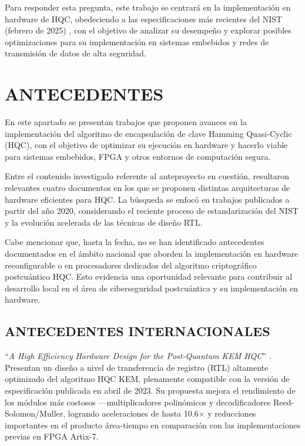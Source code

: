 Para responder esta pregunta, este trabajo se centrará en la implementación en hardware de HQC, obedeciendo a las especificaciones más recientes del NIST (febrero de 2025) \cite{HQCspec2025}, con el objetivo de analizar su desempeño y explorar posibles optimizaciones para su implementación en sistemas embebidos y redes de transmisión de datos de alta seguridad.


 \chapter{ANTECEDENTES} %
En este apartado se presentan trabajos que proponen avances en la implementación del algoritmo de encapsulación de clave Hamming Quasi-Cyclic (HQC), con el objetivo de optimizar su ejecución en hardware y hacerlo viable para sistemas embebidos, FPGA y otros entornos de computación segura.

Entre el contenido investigado referente al anteproyecto en cuestión, resultaron relevantes cuatro documentos en los que se proponen distintas arquitecturas de hardware eficientes para HQC. La búsqueda se enfocó en trabajos publicados a partir del año 2020, considerando el reciente proceso de estandarización del NIST y la evolución acelerada de las técnicas de diseño RTL.

Cabe mencionar que, hasta la fecha, no se han identificado antecedentes documentados en el ámbito nacional que aborden la implementación en hardware reconfigurable o en procesadores dedicados del algoritmo criptográfico postcuántico HQC. Esto evidencia una oportunidad relevante para contribuir al desarrollo local en el área de ciberseguridad postcuántica y su implementación en hardware.

\section{ANTECEDENTES INTERNACIONALES}
“\textit{A High Efficiency Hardware Design for the Post-Quantum KEM HQC}” \cite{Wang2024HighEfficiency}. Presentan un diseño a nivel de transferencia de registro (RTL) altamente optimizado del algoritmo HQC KEM, plenamente compatible con la versión de especificación publicada en abril de 2023. Su propuesta mejora el rendimiento de los módulos más costosos —multiplicadores polinómicos y decodificadores Reed-Solomon/Muller, logrando aceleraciones de hasta 10.6× y reducciones importantes en el producto área-tiempo en comparación con las implementaciones previas en FPGA Artix-7.

